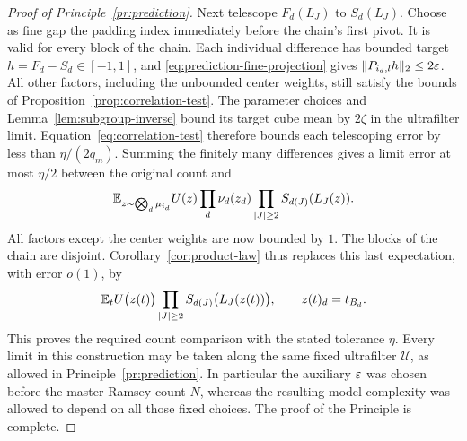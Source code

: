 \begin{proof}[Proof of Principle~\ref{pr:prediction}]
Next telescope $F_d(L_J)$ to $S_d(L_J)$.  Choose as fine gap the
padding index immediately before the chain's first pivot.  It is
valid for every block of the chain.  Each individual difference
has bounded target $h=F_d-S_d\in[-1,1]$, and
\eqref{eq:prediction-fine-projection} gives
$\|P_{i_d,l}h\|_2\leq2\varepsilon$.  All other factors, including the
unbounded center weights, still satisfy the bounds of
Proposition~\ref{prop:correlation-test}.  The parameter choices and
Lemma~\ref{lem:subgroup-inverse} bound its target cube mean by
$2\zeta$ in the ultrafilter limit.  Equation~\ref{eq:correlation-test}
therefore bounds each telescoping error by less than
$\eta/(2q_m)$.  Summing the finitely many differences gives a
limit error at most $\eta/2$ between the original count and
\[
 \mathbb E_{z\sim\bigotimes_d\mu_{i_d}}
 U(z)\prod_d\nu_d(z_d)
       \prod_{|J|\geq2}S_{d(J)}(L_J(z)).
\]
All factors except the center weights are now bounded by $1$.
The blocks of the chain are disjoint.  Corollary~\ref{cor:product-law}
thus replaces this last expectation, with error $o(1)$, by
\[
 \mathbb E_t U\bigl(z(t)\bigr)
       \prod_{|J|\geq2}S_{d(J)}\bigl(L_J(z(t))\bigr),
 \qquad z(t)_d=t_{B_d}.
\]
This proves the required count comparison with the stated tolerance
$\eta$.  Every limit in this construction may be taken along the
same fixed ultrafilter $\mathcal U$, as allowed in
Principle~\ref{pr:prediction}.  In particular the auxiliary
$\varepsilon$ was chosen before the master Ramsey count $N$, whereas the
resulting model complexity was allowed to depend on all those
fixed choices.  The proof of the Principle is complete.
\end{proof}
